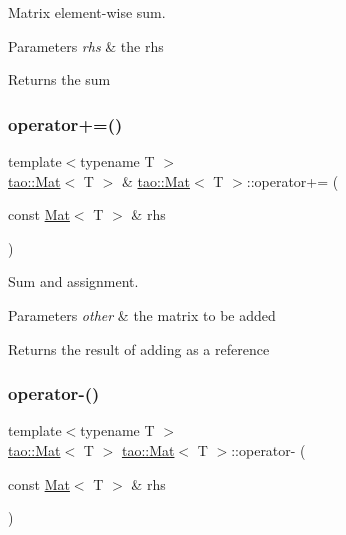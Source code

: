 Matrix element-\/wise sum. 


\begin{DoxyParams}{Parameters}
{\em rhs} & the rhs \\
\hline
\end{DoxyParams}
\begin{DoxyReturn}{Returns}
the sum 
\end{DoxyReturn}
\mbox{\label{classtao_1_1_mat_a8033892f80dec7742fbae2d4142718c9}} 
\subsubsection{\texorpdfstring{operator+=()}{operator+=()}}
{\footnotesize\ttfamily template$<$typename T $>$ \\
\mbox{\hyperlink{classtao_1_1_mat}{tao\+::\+Mat}}$<$ T $>$ \& \mbox{\hyperlink{classtao_1_1_mat}{tao\+::\+Mat}}$<$ T $>$\+::operator+= (\begin{DoxyParamCaption}\item[{const \mbox{\hyperlink{classtao_1_1_mat}{Mat}}$<$ T $>$ \&}]{rhs }\end{DoxyParamCaption})}



Sum and assignment. 


\begin{DoxyParams}{Parameters}
{\em other} & the matrix to be added \\
\hline
\end{DoxyParams}
\begin{DoxyReturn}{Returns}
the result of adding as a reference 
\end{DoxyReturn}
\mbox{\label{classtao_1_1_mat_a05438bfc32bbf1cb404baea6d596d92b}} 
\subsubsection{\texorpdfstring{operator-\/()}{operator-()}\hspace{0.1cm}{\footnotesize\ttfamily [1/2]}}
{\footnotesize\ttfamily template$<$typename T $>$ \\
\mbox{\hyperlink{classtao_1_1_mat}{tao\+::\+Mat}}$<$ T $>$ \mbox{\hyperlink{classtao_1_1_mat}{tao\+::\+Mat}}$<$ T $>$\+::operator-\/ (\begin{DoxyParamCaption}\item[{const \mbox{\hyperlink{classtao_1_1_mat}{Mat}}$<$ T $>$ \&}]{rhs }\end{DoxyParamCaption})}



